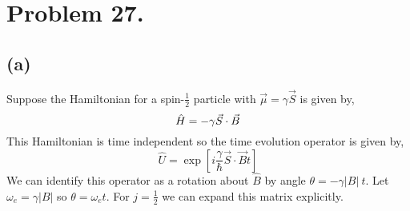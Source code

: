 \documentclass[12pt]{extarticle}
\begin{document}
\newpage

\section*{Problem 27.}

\subsection*{(a)}


Suppose the Hamiltonian for a spin-$\frac{1}{2}$ particle with $\vec{\mu} = \gamma \vec{S}$ is given by, 
\[\hat{H} = - \gamma \vec{S} \cdot \vec{B}\]
This Hamiltonian is time independent so the time evolution operator is given by,
\[ \hat{U} = \exp{\left[i \frac{\gamma}{\hbar} \vec{S} \cdot \vec{B} t \right]} \]
We can identify this operator as a rotation about $\hat{B}$ by angle $\theta = - \gamma |B| \: t$. Let $\omega_{e} = \gamma |B|$ so $\theta = \omega_{e} t$. For $j = \frac{1}{2}$ we can expand this matrix explicitly.
\end{document}
